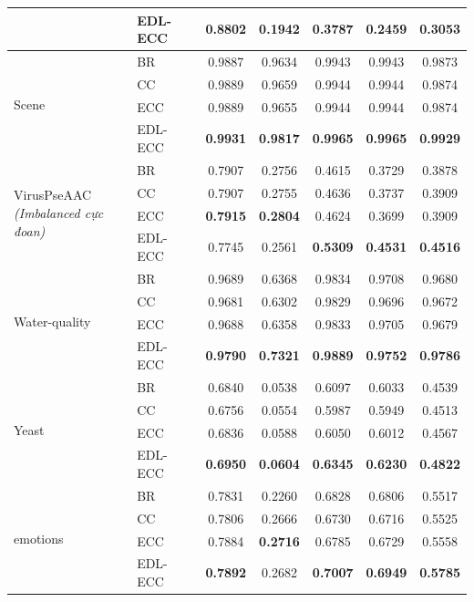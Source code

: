 \documentclass[1p,times]{elsarticle}
\begin{document}
\begin{table}[H]
\begin{tabular*}{\textwidth}{@{\extracolsep{\fill}}llccccc}
 & EDL-ECC & \textbf{0.8802} & \textbf{0.1942} & \textbf{0.3787} & \textbf{0.2459} & \textbf{0.3053} \\
\midrule
\multirow{4}{*}{Scene} 
 & BR & 0.9887 & 0.9634 & 0.9943 & 0.9943 & 0.9873 \\
 & CC & 0.9889 & 0.9659 & 0.9944 & 0.9944 & 0.9874 \\
 & ECC & 0.9889 & 0.9655 & 0.9944 & 0.9944 & 0.9874 \\
 & EDL-ECC & \textbf{0.9931} & \textbf{0.9817} & \textbf{0.9965} & \textbf{0.9965} & \textbf{0.9929} \\
\midrule
\multirow{4}{*}{\parbox{2.8cm}{VirusPseAAC\\\textit{(Imbalanced cực đoan)}}} 
 & BR & 0.7907 & 0.2756 & 0.4615 & 0.3729 & 0.3878 \\
 & CC & 0.7907 & 0.2755 & 0.4636 & 0.3737 & 0.3909 \\
 & ECC & \textbf{0.7915} & \textbf{0.2804} & 0.4624 & 0.3699 & 0.3909 \\
 & EDL-ECC & 0.7745 & 0.2561 & \textbf{0.5309} & \textbf{0.4531} & \textbf{0.4516} \\
\midrule
\multirow{4}{*}{Water-quality} 
 & BR & 0.9689 & 0.6368 & 0.9834 & 0.9708 & 0.9680 \\
 & CC & 0.9681 & 0.6302 & 0.9829 & 0.9696 & 0.9672 \\
 & ECC & 0.9688 & 0.6358 & 0.9833 & 0.9705 & 0.9679 \\
 & EDL-ECC & \textbf{0.9790} & \textbf{0.7321} & \textbf{0.9889} & \textbf{0.9752} & \textbf{0.9786} \\
\midrule
\multirow{4}{*}{Yeast} 
 & BR & 0.6840 & 0.0538 & 0.6097 & 0.6033 & 0.4539 \\
 & CC & 0.6756 & 0.0554 & 0.5987 & 0.5949 & 0.4513 \\
 & ECC & 0.6836 & 0.0588 & 0.6050 & 0.6012 & 0.4567 \\
 & EDL-ECC & \textbf{0.6950} & \textbf{0.0604} & \textbf{0.6345} & \textbf{0.6230} & \textbf{0.4822} \\
\midrule
\multirow{4}{*}{emotions} 
 & BR & 0.7831 & 0.2260 & 0.6828 & 0.6806 & 0.5517 \\
 & CC & 0.7806 & 0.2666 & 0.6730 & 0.6716 & 0.5525 \\
 & ECC & 0.7884 & \textbf{0.2716} & 0.6785 & 0.6729 & 0.5558 \\
 & EDL-ECC & \textbf{0.7892} & 0.2682 & \textbf{0.7007} & \textbf{0.6949} & \textbf{0.5785} \\
\bottomrule
\end{tabular*}
\end{table}
\end{document}
